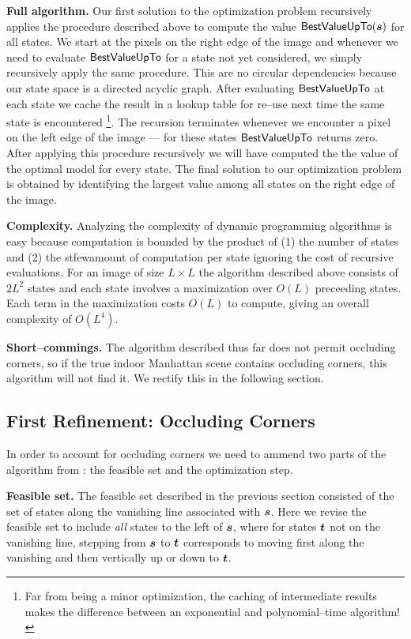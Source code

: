\textbf{Full algorithm.} Our first solution to the optimization
problem  recursively applies the procedure described
above to compute the value $\bestvalue(\State)$ for all states. We
start at the pixels on the right edge of the image and whenever we
need to evaluate $\bestvalue$ for a state not yet considered, we
simply recursively apply the same procedure. This are no circular
dependencies because our state space is a directed acyclic
graph. After evaluating $\bestvalue$ at each state we cache the result
in a lookup table for re--use next time the same state is
encountered \footnote{Far from being a minor optimization, the caching
  of intermediate results makes the difference between an exponential
  and polynomial--time algorithm!}. The recursion terminates whenever
we encounter a pixel on the left edge of the image --- for these
states $\bestvalue$ returns zero. After applying this procedure
recursively we will have computed the the value of the optimal model
for every state. The final solution to our optimization problem is
obtained by identifying the largest value among all states on the
right edge of the image.

\textbf{Complexity.} Analyzing the complexity of dynamic programming
algorithms is easy because computation is bounded by the product of
(1) the number of states and (2) the stfewamount of computation per
state ignoring the cost of recursive evaluations. For an image of size
$L \times L$ the algorithm described above consists of $2L^2$ states
and each state involves a maximization over $O(L)$ preceeding
states. Each term in the maximization costs $O(L)$ to compute, giving
an overall complexity of $O(L^4)$.

\textbf{Short--commings.} The algorithm described thus far does not
permit occluding corners, so if the true indoor Manhattan scene
contains occluding corners, this algorithm will not find it. We
rectify this in the following section.

\subsection{First Refinement: Occluding Corners}
\label{sec:amended-alg}

In order to account for occluding corners we need to ammend two
parts of the algorithm from : the
feasible set and the optimization step.

\textbf{Feasible set.} The feasible set described in the previous
section consisted of the set of states along the vanishing line
associated with $\State$. Here we revise the feasible set to include
\textit{all} states to the left of $\State$, where for states
$\OtherState$ not on the vanishing line, stepping from $\State$ to
$\OtherState$ corresponds to moving first along the vanishing and then
vertically up or down to $\OtherState$.

